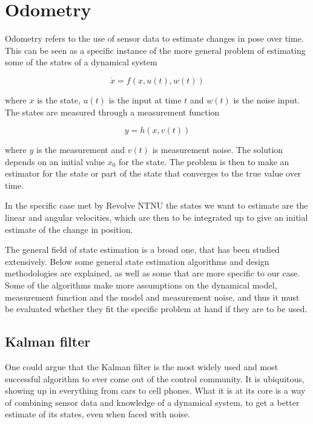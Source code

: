 \section{Odometry}

Odometry refers to the use of sensor data to estimate changes in pose over time. This can be seen as a specific instance of the more general problem of estimating some of the states of a dynamical system 

\begin{equation}
    \Dot{x} = f(x,u(t), w(t))
\end{equation}

where $x$ is the state, $u(t)$ is the input at time $t$ and $w(t)$ is the noise input. The states are measured through a measurement function

\begin{equation}
    y = h(x,v(t))
\end{equation}

where $y$ is the measurement and $v(t)$ is measurement noise. The solution depends on an initial value $x_0$ for the state. The problem is then to make an estimator for the state or part of the state that converges to the true value over time.

In the specific case met by Revolve NTNU the states we want to estimate are the linear and angular velocities, which are then to be integrated up to give an initial estimate of the change in position.

The general field of state estimation is a broad one, that has been studied extensively. Below some general state estimation algorithms and design methodologies are explained, as well as some that are more specific to our case. Some of the algorithms make more assumptions on the dynamical model, measurement function and the model and measurement noise, and thus it must be evaluated whether they fit the specific problem at hand if they are to be used. 

\subsection{Kalman filter}

One could argue that the Kalman filter is the most widely used and most successful algorithm to ever come out of the control community. It is ubiquitous, showing up in everything from cars to cell phones. What it is at its core is a way of combining sensor data and knowledge of a dynamical system, to get a better estimate of its states, even when faced with noise. 

